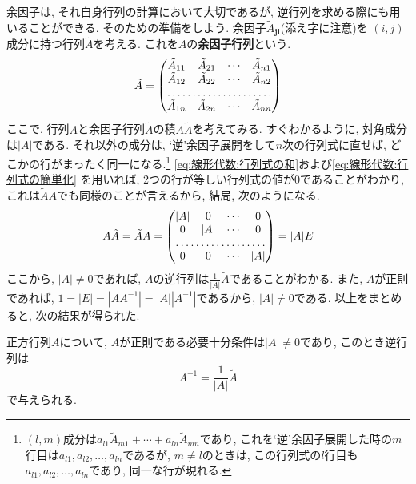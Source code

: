         余因子は, それ自身行列の計算において大切であるが, 逆行列を求める際にも用いることができる. そのための準備をしよう. 余因子$\tilde{A}_{\bm{j}\bm{i}}$(添え字に注意)を
        $(i,j)$成分に持つ行列$\tilde{A}$を考える. これを$A$の\textbf{余因子行列}という.
        \begin{equation}
            \tilde{A}
            =\begin{pmatrix}
                \tilde{A}_{11} & \tilde{A}_{21} & \cdots & \tilde{A}_{n1} \\
                \tilde{A}_{12} & \tilde{A}_{22} & \cdots & \tilde{A}_{n2} \\
                \hdotsfor{4}\\
                \tilde{A}_{1n} & \tilde{A}_{2n} & \cdots & \tilde{A}_{nn}    
            \end{pmatrix} \label{eq:線形代数:余因子行列の定義}
        \end{equation}
        ここで, 行列$A$と余因子行列$\tilde{A}$の積$A\tilde{A}$を考えてみる. すぐわかるように, 対角成分は$|A|$である. 
        それ以外の成分は, `逆'余因子展開をして$n$次の行列式に直せば, どこかの行がまったく同一になる.\footnote{$(l,m)$成分は$a_{l1}\tilde{A}_{m1}+\cdots+a_{ln}\tilde{A}_{mn}$であり, これを`逆'余因子展開した時の$m$行目は$a_{l1},a_{l2},\dots,a_{ln}$であるが,
        $m\neq l$のときは, この行列式の$l$行目も$a_{l1},a_{l2},\dots,a_{ln}$であり, 同一な行が現れる.}
            \eqref{eq:線形代数:行列式の和}および\eqref{eq:線形代数:行列式の簡単化}
        を用いれば, 2つの行が等しい行列式の値が0であることがわかり, これは$\tilde{A}A$でも同様のことが言えるから, 結局, 次のようになる.
        \begin{equation}
            A\tilde{A}=\tilde{A}A
            =\begin{pmatrix}
            |A| & 0 & \cdots & 0\\
            0 & |A| & \cdots & 0\\
            \hdotsfor{4}\\
            0 & 0 & \cdots & |A|    
            \end{pmatrix}
            =|A|E \label{eq:線形代数:余因子行列との積}
        \end{equation}
        ここから, $|A|\neq 0$であれば, $A$の逆行列は$\frac{1}{|A|}\tilde{A}$であることがわかる. また, $A$が正則であれば, $1=|E|=|AA^{-1}|=|A||A^{-1}|$であるから, $|A|\neq 0$である. 
        以上をまとめると, 次の結果が得られた.
        \begin{screen}
            正方行列$A$について, $A$が正則である必要十分条件は$|A|\neq 0$であり, このとき逆行列は
            \begin{equation}
                A^{-1}=\frac{1}{|A|}\tilde{A} \label{eq:線形代数:逆行列の公式}
            \end{equation}
            で与えられる.
        \end{screen}

